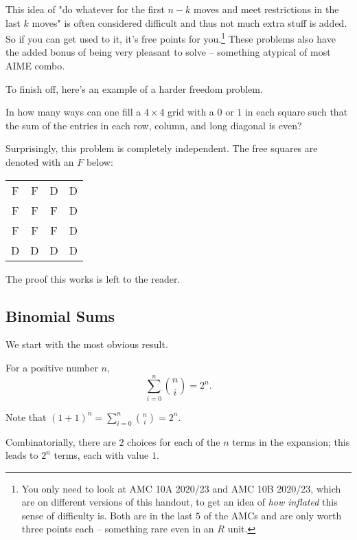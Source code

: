\documentclass[blue,onecol]{shooting}
\begin{document}
This idea of "do whatever for the first $n-k$ moves and meet restrictions in the last $k$ moves" is often considered difficult and thus not much extra stuff is added. So if you can get used to it, it's free points for you.\footnote{You only need to look at AMC 10A 2020/23 and AMC 10B 2020/23, which are on different versions of this handout, to get an idea of \textit{how inflated} this sense of difficulty is. Both are in the last $5$ of the AMCs and are only worth three points each -- something rare even in an $R$ unit.} These problems also have the added bonus of being very pleasant to solve -- something atypical of most AIME combo.

To finish off, here's an example of a harder freedom problem.

\begin{exam}
In how many ways can one fill a $4\times 4$ grid with a $0$ or $1$ in each square such that the sum of the entries in each row, column, and long diagonal is even?
\end{exam}

\begin{sol}
Surprisingly, this problem is completely independent. The free squares are denoted with an $F$ below:

\begin{tabular}{c c c c}
F & F & D & D \\
F & F & F & D \\
F & F & F & D \\
D & D & D & D
\end{tabular}

The proof this works is left to the reader.
\end{sol}

\subsection{Binomial Sums}

We start with the most obvious result.

\begin{theo}
For a positive number $n,$
\[\sum_{i=0}^{n}\binom{n}{i}=2^n.\]
\end{theo}

\begin{pro}
Note that $(1+1)^n=\sum\limits_{i=0}^{n}\binom{n}{i}=2^n.$

Combinatorially, there are $2$ choices for each of the $n$ terms in the expansion; this leads to $2^n$ terms, each with value $1.$
\end{pro}
\end{document}
